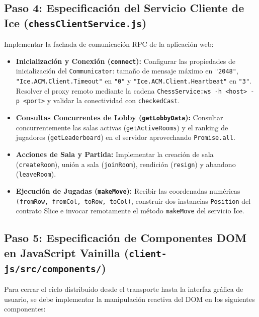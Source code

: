 \documentclass[10pt,letterpaper]{article}
\begin{document}
\subsection*{Paso 4: Especificación del Servicio Cliente de Ice (\texttt{chessClientService.js})}
Implementar la fachada de comunicación RPC de la aplicación web:
\begin{itemize}[leftmargin=*,itemsep=2pt]
    \item \textbf{Inicialización y Conexión (\texttt{connect}):}
    Configurar las propiedades de inicialización del \texttt{Communicator}: tamaño de mensaje máximo en \texttt{"2048"}, \texttt{"Ice.ACM.Client.Timeout"} en \texttt{"0"} y \texttt{"Ice.ACM.Client.Heartbeat"} en \texttt{"3"}. Resolver el proxy remoto mediante la cadena \lstinline|ChessService:ws -h <host> -p <port>| y validar la conectividad con \texttt{checkedCast}.
    \item \textbf{Consultas Concurrentes de Lobby (\texttt{getLobbyData}):}
    Consultar concurrentemente las salas activas (\texttt{getActiveRooms}) y el ranking de jugadores (\texttt{getLeaderboard}) en el servidor aprovechando \texttt{Promise.all}.
    \item \textbf{Acciones de Sala y Partida:}
    Implementar la creación de sala (\texttt{createRoom}), unión a sala (\texttt{joinRoom}), rendición (\texttt{resign}) y abandono (\texttt{leaveRoom}).
    \item \textbf{Ejecución de Jugadas (\texttt{makeMove}):}
    Recibir las coordenadas numéricas \texttt{(fromRow, fromCol, toRow, toCol)}, construir dos instancias \texttt{Position} del contrato Slice e invocar remotamente el método \texttt{makeMove} del servicio Ice.
\end{itemize}

\subsection*{Paso 5: Especificación de Componentes DOM en JavaScript Vainilla (\texttt{client-js/src/components/})}
Para cerrar el ciclo distribuido desde el transporte hasta la interfaz gráfica de usuario, se debe implementar la manipulación reactiva del DOM en los siguientes componentes:
\end{document}
